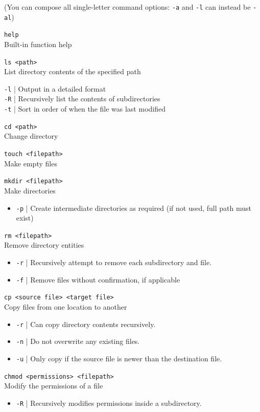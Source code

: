 \documentclass[a4paper,11pt,parskip=half-]{scrartcl}
\begin{document}
(You can compose all single-letter command options: \texttt{-a} and \texttt{-l} can instead be \texttt{-al})

\Large \texttt{help} \normalsize \\
Built-in function help

\Large \texttt{ls <path>} \normalsize \\
List directory contents of the specified path

\qquad \texttt{-l} | Output in a detailed format \\
\qquad \texttt{-R} | Recursively list the contents of subdirectories \\
\qquad \texttt{-t} | Sort in order of when the file was last modified

\Large \texttt{cd <path>} \normalsize \\
Change directory

\Large \texttt{touch <filepath>} \normalsize \\
Make empty files

\Large \texttt{mkdir <filepath>} \normalsize \\
Make directories
\begin{itemize}
    \item \texttt{-p} | Create intermediate directories as required (if not used, full path must exist)
\end{itemize}

\Large \texttt{rm <filepath>} \normalsize \\
Remove directory entities
\begin{itemize}
    \item \texttt{-r} | Recursively attempt to remove each subdirectory and file.
    \item \texttt{-f} | Remove files without confirmation, if applicable
\end{itemize}


\Large \texttt{cp <source file> <target file>} \normalsize \\
Copy files from one location to another
\begin{itemize}
    \item \texttt{-r} | Can copy directory contents recursively.
    \item \texttt{-n} | Do not overwrite any existing files.
    \item \texttt{-u} | Only copy if the source file is newer than the destination file.
\end{itemize}

\Large \texttt{chmod <permissions> <filepath>} \normalsize \\
Modify the permissions of a file
\begin{itemize}
    \item \texttt{-R} | Recursively modifies permissions inside a subdirectory.
\end{itemize}
\end{document}
